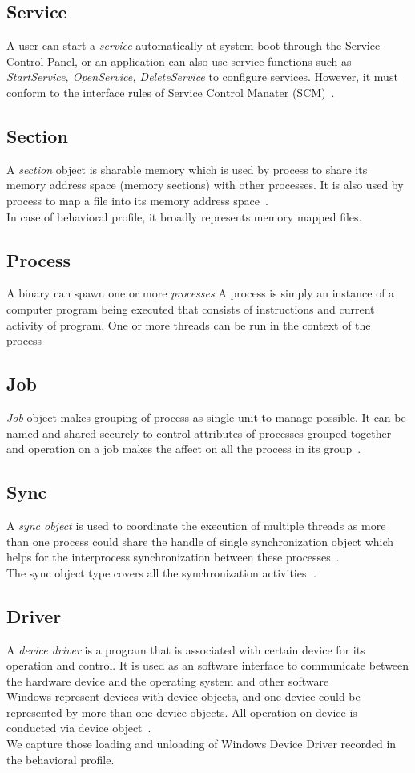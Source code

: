 \subsection{Service}
\label{sub:Service}
A user can start a \emph{service} automatically at system boot through the Service Control Panel, or an application can also use service functions such as \emph{StartService, OpenService, DeleteService} to configure services.
However, it must conform to the interface rules of Service Control Manater (SCM)~\cite[]{msservice}.
\subsection{Section}
\label{sub:Section}
A \emph{section} object is sharable memory which is used by process to share its memory address space (memory sections) with other processes.
It is also used by process to map a file into its memory address space~\cite[]{mssection}.\\
In case of behavioral profile, it broadly represents memory mapped files.
\subsection{Process}
\label{sub:Process}
A binary can spawn one or more \emph{processes}
A process is simply an instance of a computer program being executed that consists of instructions and current activity of program.
One or more threads can be run in the context of the process~\cite[]{msprocess} 
\subsection{Job}
\label{sub:Job}
\emph{Job} object makes grouping of process as single unit  to manage possible.
It can be named and shared securely to control attributes of processes grouped together and operation on a job makes the affect on all the process in its group~\cite[]{msjob}.
\subsection{Sync}
\label{sub:Sync}
A \emph{sync object} is used to coordinate the execution of multiple threads as more than one process could share the handle of single synchronization object which helps for the interprocess synchronization between these processes~\cite[]{mssync}.\\
The sync object type covers all the synchronization activities.
\cite[]{mssync}.
\subsection{Driver}
\label{sub:Driver}
A \emph{device driver } is a program that is associated with certain device for its operation and control. It is used as an software interface to communicate between the hardware device and the operating system and other software~\cite[Device Driver]{devicedriver} \\
Windows represent devices with device objects, and one device could be represented by more than one device objects. All operation on device is conducted via device object~\cite[]{msdevice}.\\
We capture those loading and unloading of Windows Device Driver recorded in the behavioral profile.
